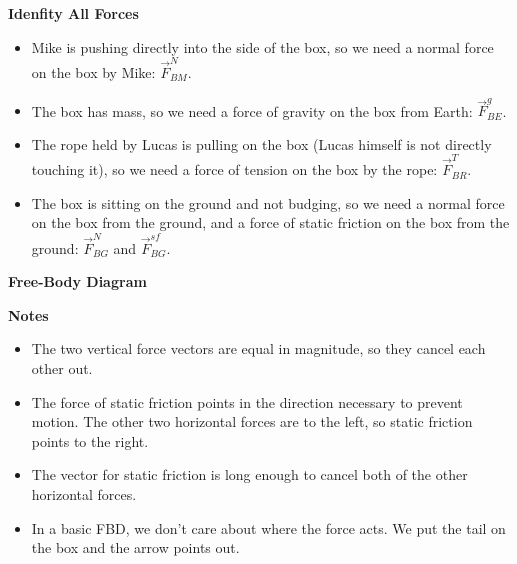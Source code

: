 \documentclass[]{article}
\begin{document}
\newpage
\begin{TeacherMargin}
\noindent\textbf{Idenfity All Forces}
\begin{itemize}
	\item Mike is pushing directly into the side of the box, so we need a normal force on the box by Mike: $\vec{F}^{N}_{BM}$.
	\item The box has mass, so we need a force of gravity on the box from Earth: $\vec{F}^{g}_{BE}$.
	\item The rope held by Lucas is pulling on the box (Lucas himself is not directly touching it), so we need a force of tension on the box by the rope: $\vec{F}^{T}_{BR}$.
	\item The box is sitting on the ground and not budging, so we need a normal force on the box from the ground, and a force of static friction on the box from the ground: $\vec{F}^{N}_{BG}$ and $\vec{F}^{sf}_{BG}$.
\end{itemize}
\noindent\textbf{Free-Body Diagram}
\vspace{-0.75cm}
\begin{center}
\end{center}
\vspace{-0.75cm}
\textbf{Notes}
\begin{itemize}
	\item The two vertical force vectors are equal in magnitude, so they cancel each other out.
	\item The force of static friction points in the direction necessary to prevent motion. The other two horizontal forces are to the left, so static friction points to the right.
	\item The vector for static friction is long enough to cancel both of the other horizontal forces.
	\item In a basic FBD, we don't care about where the force acts. We put the tail on the box and the arrow points out.

\end{itemize}
\end{TeacherMargin}
\end{document}
